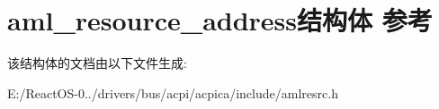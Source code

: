 \hypertarget{structaml__resource__address}{}\section{aml\+\_\+resource\+\_\+address结构体 参考}
\label{structaml__resource__address}


该结构体的文档由以下文件生成\+:\begin{DoxyCompactItemize}
\item 
E\+:/\+React\+O\+S-\/0../drivers/bus/acpi/acpica/include/amlresrc.\+h\end{DoxyCompactItemize}
